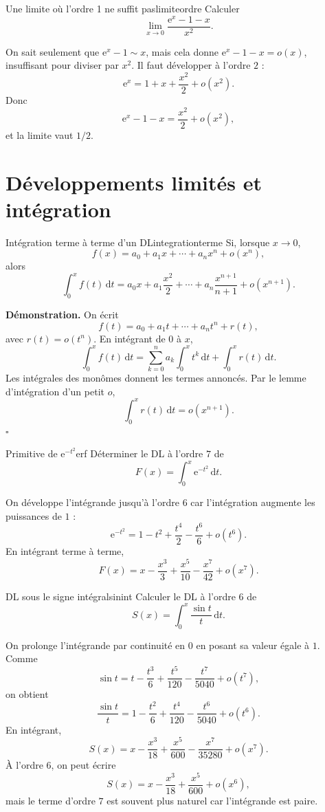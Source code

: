 \documentclass[11pt,a4paper]{article}
\newcommand{\e}{\mathrm{e}}
\newcommand{\dd}{\mathrm{d}}
\begin{document}
\begin{examplebox}{Une limite où l'ordre 1 ne suffit pas}{limiteordre}
Calculer
\[
  \lim_{x\to0}\frac{\e^x-1-x}{x^2}.
\]
\end{examplebox}

On sait seulement que $\e^x-1\sim x$, mais cela donne $\e^x-1-x=o(x)$, insuffisant pour diviser par $x^2$. Il faut développer à l'ordre $2$ :
\[
  \e^x=1+x+\frac{x^2}{2}+o(x^2).
\]
Donc
\[
  \e^x-1-x=\frac{x^2}{2}+o(x^2),
\]
et la limite vaut $1/2$.

\section{Développements limités et intégration}

\begin{theorembox}{Intégration terme à terme d'un DL}{integrationterme}
Si, lorsque $x\to0$,
\[
  f(x)=a_0+a_1x+\cdots+a_nx^n+o(x^n),
\]
alors
\[
  \int_0^x f(t)\,\dd t
  =a_0x+a_1\frac{x^2}{2}+\cdots+a_n\frac{x^{n+1}}{n+1}+o(x^{n+1}).
\]
\end{theorembox}

\textbf{Démonstration.} On écrit
\[
  f(t)=a_0+a_1t+\cdots+a_nt^n+r(t),
\]
avec $r(t)=o(t^n)$. En intégrant de $0$ à $x$,
\[
  \int_0^x f(t)\,\dd t
  =\sum_{k=0}^n a_k\int_0^x t^k\,\dd t+\int_0^x r(t)\,\dd t.
\]
Les intégrales des monômes donnent les termes annoncés. Par le lemme d'intégration d'un petit $o$,
\[
  \int_0^x r(t)\,\dd t=o(x^{n+1}).
\]
\hfill $\square$

\begin{examplebox}{Primitive de $\e^{-t^2}$}{erf}
Déterminer le DL à l'ordre $7$ de
\[
  F(x)=\int_0^x \e^{-t^2}\,\dd t.
\]
\end{examplebox}

On développe l'intégrande jusqu'à l'ordre $6$ car l'intégration augmente les puissances de $1$ :
\[
  \e^{-t^2}=1-t^2+\frac{t^4}{2}-\frac{t^6}{6}+o(t^6).
\]
En intégrant terme à terme,
\[
  F(x)=x-\frac{x^3}{3}+\frac{x^5}{10}-\frac{x^7}{42}+o(x^7).
\]

\begin{examplebox}{DL sous le signe intégral}{sinint}
Calculer le DL à l'ordre $6$ de
\[
  S(x)=\int_0^x \frac{\sin t}{t}\,\dd t.
\]
\end{examplebox}

On prolonge l'intégrande par continuité en $0$ en posant sa valeur égale à $1$. Comme
\[
  \sin t=t-\frac{t^3}{6}+\frac{t^5}{120}-\frac{t^7}{5040}+o(t^7),
\]
on obtient
\[
  \frac{\sin t}{t}=1-\frac{t^2}{6}+\frac{t^4}{120}-\frac{t^6}{5040}+o(t^6).
\]
En intégrant,
\[
  S(x)=x-\frac{x^3}{18}+\frac{x^5}{600}-\frac{x^7}{35280}+o(x^7).
\]
À l'ordre $6$, on peut écrire
\[
  S(x)=x-\frac{x^3}{18}+\frac{x^5}{600}+o(x^6),
\]
mais le terme d'ordre $7$ est souvent plus naturel car l'intégrande est paire.
\end{document}
